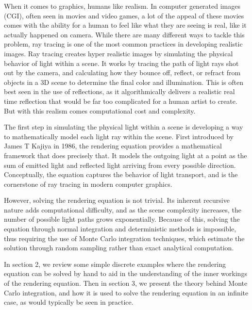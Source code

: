 \documentclass[12pt]{article}
\begin{document}
When it comes to graphics, humans like realism. In computer generated images (CGI), often seen in movies and video games, a lot of the appeal of these movies comes with the ability for a human to feel like what they are seeing is real, like it actually happened on camera. While there are many different ways to tackle this problem, ray tracing is one of the most common practices in developing realistic images. Ray tracing creates hyper realistic images by simulating the physical behavior of light within a scene. It works by tracing the path of light rays shot out by the camera, and calculating how they bounce off, reflect, or refract from objects in a 3D scene to determine the final color and illumination. This is often best seen in the use of reflections, as it algorithmically delivers a realistic real time reflection that would be far too complicated for a human artist to create. But with this realism comes computational cost and complexity.



The first step in simulating the physical light within a scene is developing a way to mathematically model each light ray within the scene. First introduced by James T Kajiya in 1986, the rendering equation provides a mathematical framework that does precisely that. It models the outgoing light at a point as the sum of emitted light and reflected light arriving from every possible direction. Conceptually, the equation captures the behavior of light transport, and is the cornerstone of ray tracing in modern computer graphics.


However, solving the rendering equation is not trivial. Its inherent recursive nature adds computational difficulty, and as the scene complexity increases, the number of possible light paths grows exponentially. Because of this, solving the equation through normal integration and deterministic methods is impossible, thus requiring the use of Monte Carlo integration techniques, which estimate the solution through random sampling rather than exact analytical computation. 

In section 2, we review some simple discrete examples where the rendering equation can be solved by hand to aid in the understanding of the inner workings of the rendering equation. Then in section 3, we present the theory behind Monte Carlo integration, and how it is used to solve the rendering equation in an infinite case, as would typically be seen in practice.
\end{document}
